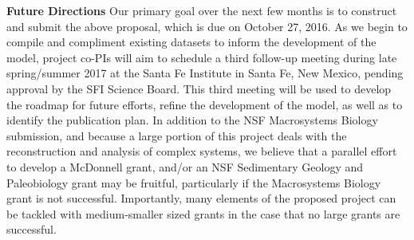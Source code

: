 \documentclass{article}[10pt]
\begin{document}
\vspace{5 mm}

{\bf Future Directions} Our primary goal over the next few months is to construct and submit the above proposal, which is due on October 27, 2016.
As we begin to compile and compliment existing datasets to inform the development of the model, project co-PIs will aim to schedule a third follow-up meeting during late spring/summer 2017 at the Santa Fe Institute in Santa Fe, New Mexico, pending approval by the SFI Science Board.
This third meeting will be used to develop the roadmap for future efforts, refine the development of the model, as well as to identify the publication plan.
In addition to the NSF Macrosystems Biology submission, and because a large portion of this project deals with the reconstruction and analysis of complex systems, we believe that a parallel effort to develop a McDonnell grant, and/or an NSF Sedimentary Geology and Paleobiology grant may be fruitful, particularly if the Macrosystems Biology grant is not successful.
Importantly, many elements of the proposed project can be tackled with medium-smaller sized grants in the case that no large grants are successful.
\end{document}
